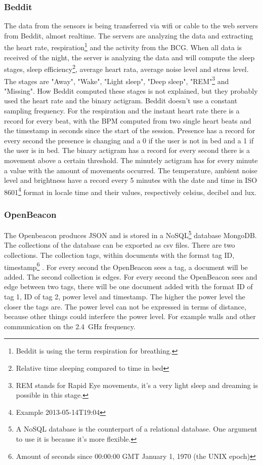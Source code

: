 		\subsubsection{Beddit}
		\label{sec:datadescriptionbeddit}
		The data from the sensors is being transferred via wifi or cable to the web servers from Beddit, almost realtime. The servers are analyzing the data and extracting the heart rate, respiration\footnote{Beddit is using the term respiration for breathing.} and the activity from the BCG. When all data is received of the night, the server is analyzing the data and will compute the sleep stages, sleep efficiency\footnote{Relative time sleeping compared to time in bed}, average heart rata, average noise level and stress level. The stages are "Away", "Wake", "Light sleep", "Deep sleep", "REM"\footnote{REM stands for Rapid Eye movements, it's a very light sleep and dreaming is possible in this stage.} and "Missing". How Beddit computed these stages is not explained, but they probably used the heart rate and the binary actigram. Beddit doesn't use a constant sampling frequency. For the respiration and the instant heart rate there is a record for every beat, with the BPM computed from two single heart beats and the timestamp in seconds since the start of the session. Presence has a record for every second the presence is changing and a 0 if the user is not in bed and a 1 if the user is in bed. The binary actigram has a record for every second there is a movement above a certain threshold. The minutely actigram has for every minute a value with the amount of movements occurred. The temperature, ambient noise level and brightness have a record every 5 minutes with the date and time in ISO 8601\footnote{Example 2013-05-14T19:04\cite{iso8601}} format in locale time and their values, respectively celsius, decibel and lux.

		\subsubsection{OpenBeacon}
			The Openbeacon produces JSON and is stored in a NoSQL\footnote{A NoSQL database is the counterpart of a relational database. One argument to use it is because it's more flexible.} database MongoDB. The collections of the database can be exported as csv files.
			There are two collections. The collection tags, within documents with the format tag ID, timestamp\footnote{Amount of seconds since 00:00:00 GMT January 1, 1970 (the UNIX epoch)} . For every second the OpenBeacon sees a tag, a document will be added.
			The second collection is edges. For every second the OpenBeacon sees and edge between two tags, there will be one document added with the format ID of tag 1, ID of tag 2, power level and timestamp.
			The higher the power level the closer the tags are. The power level can not be expressed in terms of distance, because other things could interfere the power level. For example walls and other communication on the \SI{2.4}{\giga\hertz} frequency.
